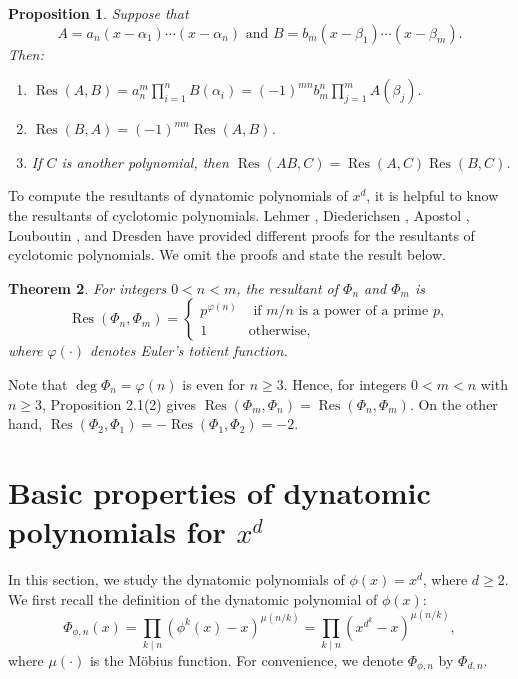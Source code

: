 \documentclass[10pt,leqno]{amsart}
\newtheorem{theorem}{Theorem}[section]
\newtheorem{proposition}[theorem]{Proposition}
\theoremstyle{definition}
\theoremstyle{remark}
\numberwithin{equation}{section}
\newcommand{\res}{\operatorname{Res}}
\begin{document}
\begin{proposition} 
    Suppose that
    $$A = a_n(x-\alpha_1)\cdots(x-\alpha_n)\text{ and }B = b_m(x-\beta_1)\cdots(x-\beta_m).$$
    Then:
    \begin{enumerate}
        \item $\res(A,B) = a_n^m\prod_{i = 1}^nB(\alpha_i) = (-1)^{mn}b_m^n\prod_{j = 1}^mA(\beta_j).$
        \item $\res(B,A) = (-1)^{mn}\res(A,B)$.
        \item If $C$ is another polynomial, then $\res(AB,C) = \res(A,C)\res(B,C)$.
    \end{enumerate}
\end{proposition}

To compute the resultants of dynatomic polynomials of $x^d$, it is helpful to know the resultants of cyclotomic polynomials. Lehmer \cite{Lehmer30}, Diederichsen \cite{Diederichsen40}, Apostol \cite{Apostol70}, Louboutin \cite{Louboutin97}, and Dresden \cite{Dresden12} have provided different proofs for the resultants of cyclotomic polynomials. We omit the proofs and state the result below.

\begin{theorem}
    For integers $0<n<m$, the resultant of $\Phi_n$ and $\Phi_m$ is
    $$\res(\Phi_n,\Phi_m) = \begin{cases}
        p^{\varphi(n)} &\text{ if }m/n\text{ is a power of a prime }p,\\
        1 &\text{otherwise},
    \end{cases}$$
    where $\varphi(\cdot)$ denotes Euler's totient function.
\end{theorem}

Note that $\deg\Phi_n = \varphi(n)$ is even for $n\geq 3$. Hence, for integers $0<m<n$ with $n\geq 3$, Proposition 2.1(2) gives $\res(\Phi_m,\Phi_n) = \res(\Phi_n,\Phi_m)$. On the other hand, $\res(\Phi_2,\Phi_1) = -\res(\Phi_1,\Phi_2) = -2$.

\section{Basic properties of dynatomic polynomials for $x^d$}

In this section, we study the dynatomic polynomials of $\phi(x) = x^d$, where $d\geq 2$. We first recall the definition of the dynatomic polynomial of $\phi(x)$:
$$\Phi_{\phi,n}(x) = \prod_{k\mid n}(\phi^k(x)-x)^{\mu(n/k)} = \prod_{k\mid n}(x^{d^k}-x)^{\mu(n/k)},$$
where $\mu(\cdot)$ is the Möbius function. For convenience, we denote $\Phi_{\phi,n}$ by $\Phi_{d,n}$.
\end{document}
